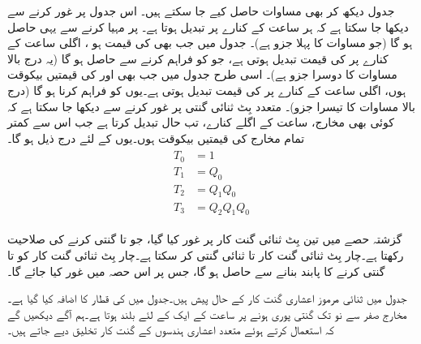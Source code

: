  جدول  دیکھ کر بھی مساوات  حاصل کیے جا سکتے ہیں۔ اس جدول پر غور کرنے سے دیکھا جا سکتا ہے کہ  ہر ساعت کے کنارے پر تبدیل ہوتا ہے۔  پر  مہیا کرنے سے یہی حاصل ہو گا (جو مساوات  کا پہلا جزو ہے)۔ جدول میں جب بھی  کی قیمت  ہو ، اگلی ساعت کے کنارے پر  کی قیمت تبدیل ہوتی ہے، جو  کو  فراہم کرنے سے حاصل ہو گا (یہ درج بالا مساوات کا دوسرا جزو ہے)۔ اسی طرح جدول میں جب بھی  اور  کی قیمتیں بیکوقت  ہوں، اگلی ساعت کے کنارے پر  کی قیمت تبدیل ہوتی ہے۔یوں  کو  فراہم کرنا ہو گا (درج بالا مساوات کا تیسرا جزو)۔ متعدد بِٹ ثنائی گنتی پر غور کرنے سے دیکھا جا سکتا ہے کہ کوئی بھی مخارج، ساعت کے اگلے کنارے، تب حال تبدیل کرتا ہے جب اس سے کمتر تمام مخارج کی قیمتیں بیکوقت  ہوں۔یوں  کے لئے درج ذیل ہو گا۔
\begin{gather}
\begin{aligned}\label{مساوات_گنت_کار_چار_بِٹ}
T_0&=1\\
T_1&=Q_0\\
T_2&=Q_1Q_0\\
T_3&=Q_2Q_1Q_0
\end{aligned}
\end{gather}

گزشتہ حصے میں تین بِٹ ثنائی گنت کار پر غور کیا گیا، جو  تا  گنتی کرنے کی صلاحیت رکھتا ہے۔چار بِٹ ثنائی گنت کار  تا  ثنائی گنتی کر سکتا ہے۔چار بِٹ ثنائی گنت کار  کو  تا  گنتی کرنے کا پابند بنانے سے  حاصل ہو گا، جس پر اس حصہ میں غور کیا جائے گا۔

جدول  میں ثنائی  مرموز  اعشاری گنت کار کے حال پیش ہیں۔جدول میں   کی قطار کا اضافہ کیا گیا ہے۔مخارج  صفر سے نو تک گنتی پوری ہونے پر ساعت کے ایک کے لئے بلند ہوتا ہے۔ہم آگے دیکھیں گے کہ  استعمال کرتے ہوئے متعدد اعشاری ہندسوں کے گنت کار تخلیق دیے جاتے ہیں۔


